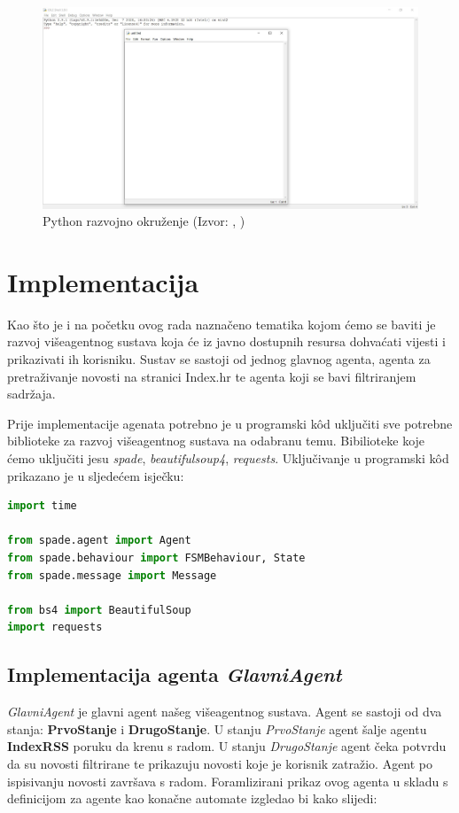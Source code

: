 \documentclass[]{foi} %
\begin{document}
\begin{figure}[h!]
    \centering
    \includegraphics[width=1.0\textwidth]{slike/pythonIDLE.jpg}
    \caption{Python razvojno okruženje (Izvor: \citeauthor{idle}, \citeyear{idle})}
    \label{fig:PythonIDLE}
\end{figure}

\newpage

\chapter{Implementacija}

Kao što je i na početku ovog rada naznačeno tematika kojom ćemo se baviti je razvoj višeagentnog sustava koja će iz javno dostupnih resursa dohvaćati vijesti i prikazivati ih korisniku. Sustav se sastoji od jednog glavnog agenta, agenta za pretraživanje novosti na stranici Index.hr te agenta koji se bavi filtriranjem sadržaja.

Prije implementacije agenata potrebno je u programski kôd uključiti sve potrebne biblioteke za razvoj višeagentnog sustava na odabranu temu. Bibilioteke koje ćemo uključiti jesu \textit{spade}, \textit{beautifulsoup4}, \textit{requests}. Uključivanje u programski kôd prikazano je u sljedećem isječku:

\begin{lstlisting}[language=Python]
import time

from spade.agent import Agent
from spade.behaviour import FSMBehaviour, State
from spade.message import Message

from bs4 import BeautifulSoup
import requests
\end{lstlisting}

\section{Implementacija agenta \textit{GlavniAgent}}
\textit{GlavniAgent} je glavni agent našeg višeagentnog sustava. Agent se sastoji od dva stanja: \textbf{PrvoStanje} i \textbf{DrugoStanje}. U stanju \textit{PrvoStanje} agent šalje agentu \textbf{IndexRSS} poruku da krenu s radom. U stanju \textit{DrugoStanje} agent čeka potvrdu da su novosti filtrirane te prikazuju novosti koje je korisnik zatražio. Agent po ispisivanju novosti završava s radom. Foramlizirani prikaz ovog agenta u skladu s definicijom za agente kao konačne automate izgledao bi kako slijedi:
\end{document}
